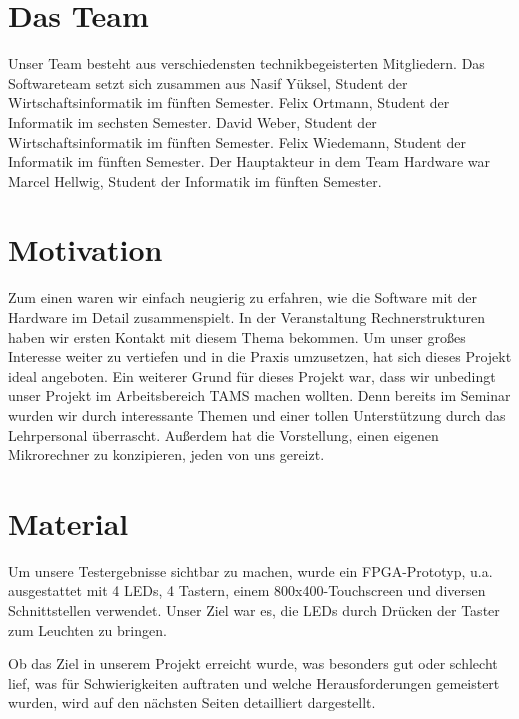 \section{Das Team}
Unser Team besteht aus verschiedensten technikbegeisterten Mitgliedern. Das Softwareteam setzt sich zusammen aus Nasif Yüksel, Student der Wirtschaftsinformatik im fünften Semester.  Felix Ortmann, Student der Informatik im sechsten Semester. David Weber, Student der Wirtschaftsinformatik im fünften Semester. Felix Wiedemann, Student der Informatik im fünften Semester. Der Hauptakteur in dem Team Hardware war Marcel Hellwig, Student der Informatik im fünften Semester.

\section{Motivation}
Zum einen waren wir einfach neugierig zu erfahren, wie die Software mit der Hardware im Detail zusammenspielt. In der Veranstaltung Rechnerstrukturen haben wir ersten Kontakt mit diesem Thema bekommen. Um unser großes Interesse weiter zu vertiefen und in die Praxis umzusetzen, hat sich dieses Projekt ideal angeboten.
Ein weiterer Grund für dieses Projekt war, dass wir unbedingt unser Projekt im Arbeitsbereich TAMS machen wollten. Denn bereits im Seminar wurden wir durch interessante Themen und einer tollen Unterstützung durch das Lehrpersonal überrascht.
Außerdem hat die Vorstellung, einen eigenen Mikrorechner zu konzipieren, jeden von uns gereizt.

\section{Material}
Um unsere Testergebnisse sichtbar zu machen, wurde ein FPGA-Prototyp, u.a. ausgestattet mit 4 LEDs, 4 Tastern, einem 800x400-Touchscreen und diversen Schnittstellen verwendet. Unser Ziel war es, die LEDs durch Drücken der Taster zum Leuchten zu bringen.

Ob das Ziel in unserem Projekt erreicht wurde, was besonders gut oder schlecht lief, was für Schwierigkeiten auftraten und welche Herausforderungen gemeistert wurden, wird auf den nächsten Seiten detailliert dargestellt. 
